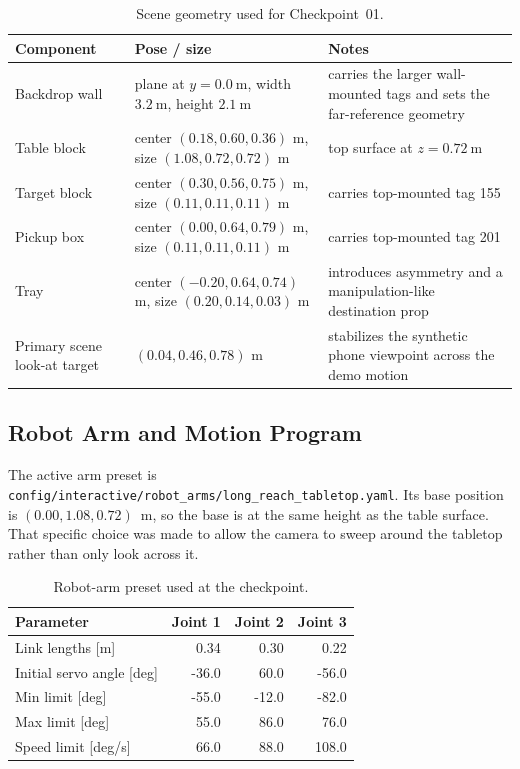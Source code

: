\documentclass[11pt,a4paper]{article}
\begin{document}
\begin{table}[H]
\centering
\caption{Scene geometry used for Checkpoint~01.}
\label{tab:scene-geometry}
\begin{tabularx}{\linewidth}{l>{\raggedright\arraybackslash}X>{\raggedright\arraybackslash}X}
\toprule
Component & Pose / size & Notes \\
\midrule
Backdrop wall & plane at $y=\SI{0.0}{\meter}$, width $\SI{3.2}{\meter}$, height $\SI{2.1}{\meter}$ & carries the larger wall-mounted tags and sets the far-reference geometry \\
Table block & center $(0.18, 0.60, 0.36)$ m, size $(1.08, 0.72, 0.72)$ m & top surface at $z=\SI{0.72}{\meter}$ \\
Target block & center $(0.30, 0.56, 0.75)$ m, size $(0.11, 0.11, 0.11)$ m & carries top-mounted tag 155 \\
Pickup box & center $(0.00, 0.64, 0.79)$ m, size $(0.11, 0.11, 0.11)$ m & carries top-mounted tag 201 \\
Tray & center $(-0.20, 0.64, 0.74)$ m, size $(0.20, 0.14, 0.03)$ m & introduces asymmetry and a manipulation-like destination prop \\
Primary scene look-at target & $(0.04, 0.46, 0.78)$ m & stabilizes the synthetic phone viewpoint across the demo motion \\
\bottomrule
\end{tabularx}
\end{table}

\subsection{Robot Arm and Motion Program}

The active arm preset is \texttt{config/interactive/robot\_arms/long\_reach\_tabletop.yaml}.
Its base position is $(0.00, 1.08, 0.72)$~m, so the base is at the same height as the table surface.
That specific choice was made to allow the camera to sweep around the tabletop rather than only look across it.

\begin{table}[H]
\centering
\caption{Robot-arm preset used at the checkpoint.}
\label{tab:robot-arm}
\begin{tabular}{lrrr}
\toprule
Parameter & Joint 1 & Joint 2 & Joint 3 \\
\midrule
Link lengths [m] & 0.34 & 0.30 & 0.22 \\
Initial servo angle [deg] & -36.0 & 60.0 & -56.0 \\
Min limit [deg] & -55.0 & -12.0 & -82.0 \\
Max limit [deg] & 55.0 & 86.0 & 76.0 \\
Speed limit [deg/s] & 66.0 & 88.0 & 108.0 \\
\bottomrule
\end{tabular}
\end{table}
\end{document}
